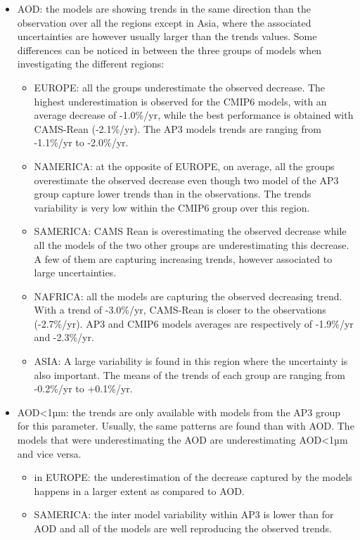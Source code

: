 \documentclass[journal abbreviation, manuscript]{copernicus}
\begin{document}
\begin{itemize}
 \item AOD: the models are showing trends in the same direction than the observation over all the regions except in Asia, where the associated uncertainties are however usually larger than the trends values. Some differences can be noticed in between the three groups of models when investigating the different regions:
       \begin{itemize}
        \item EUROPE: all the groups underestimate the observed decrease. The highest underestimation is observed for the CMIP6 models, with an average decrease of -1.0\%/yr, while the best performance is obtained with CAMS-Rean (-2.1\%/yr). The AP3 models trends are ranging from -1.1\%/yr to -2.0\%/yr.
        \item NAMERICA: at the opposite of EUROPE, on average, all the groups overestimate the observed decrease even though two model of the AP3 group capture lower trends than in the observations. The trends variability is very low within the CMIP6 group over this region.
        \item SAMERICA: CAMS Rean is overestimating the observed decrease while all the models of the two other groups are underestimating this decrease. A few of them are capturing increasing trends, however associated to large uncertainties.
        \item NAFRICA: all the models are capturing the observed decreasing trend. With a trend of -3.0\%/yr, CAMS-Rean is closer to the observations (-2.7\%/yr). AP3 and CMIP6 models averages are respectively of -1.9\%/yr and -2.3\%/yr.
        \item ASIA: A large variability is found in this region where the uncertainty is also important. The means of the trends of each group are ranging from -0.2\%/yr to +0.1\%/yr.
       \end{itemize}
 \item AOD<1µm: the trends are only available with models from the AP3 group for this parameter. Usually, the same patterns are found than with AOD. The models that were underestimating the AOD are underestimating AOD<1µm and vice versa.
       \begin{itemize}
        \item in EUROPE: the underestimation of the decrease captured by the models happens in a larger extent as compared to AOD.
        \item SAMERICA: the inter model variability within AP3 is lower than for AOD and all of the models are well reproducing the observed trends.

\end{itemize}
\end{itemize}
\end{document}
